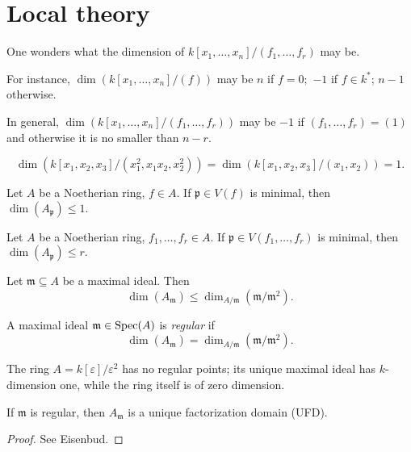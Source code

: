 \section{Local theory}
One wonders what the dimension of \(k[x_1, \dotsc, x_n] / {(f_1, \dotsc, f_r)}\) may be.

For instance, \(\dim(k[x_1, \dotsc, x_n]/{(f)})\) may be \(n\) if \(f=0;\) \(-1\) if \(f \in k^*\); \(n-1\) otherwise.

In general, \(\dim(k[x_1, \dotsc, x_n]/{(f_1, \dotsc, f_r)})\) may be \(-1\) if \((f_1, \dotsc, f_r) = (1)\) and otherwise it is no smaller than \(n - r.\)

\begin{example}
  \[\dim(k[x_1, x_2, x_3]/{(x_1^2, x_1 x_2, x_2^2)}) = \dim(k[x_1, x_2, x_3]/{(x_1, x_2)}) = 1.\]
\end{example}

\begin{theorem}
  Let \(A\) be a Noetherian ring, \(f \in A.\) If \(\mathfrak p \in V(f)\) is minimal, then
  \(\dim(A_{\mathfrak p}) \leq 1.\)
\end{theorem}

\begin{corollary}
  Let \(A\) be a Noetherian ring, \(f_1, \dotsc, f_r \in A.\) If \(\mathfrak p \in V(f_1, \dotsc, f_r)\) is minimal, then \(\dim(A_{\mathfrak p}) \leq r.\)
\end{corollary}

\begin{corollary}
  Let \(\mathfrak m \subseteq A\) be a  maximal ideal. Then
  \[\dim(A_{\mathfrak m}) \leq \dim_{A/{\mathfrak m}} (\mathfrak m /{\mathfrak m^2}).\] 
\end{corollary}

\begin{df}
  A maximal ideal \(\mathfrak m \in \text{Spec}(A)\) is \emph{regular} if
  \[\dim(A_{\mathfrak m}) = \dim_{A/{\mathfrak m}} (\mathfrak m /{\mathfrak m^2}).\]
\end{df}

\begin{example}
  The ring \(A = k[\varepsilon]/{\varepsilon^2}\) has no regular points; its unique maximal ideal has \(k\)-dimension one, while the ring itself is of zero dimension.
\end{example}

\begin{theorem}
  If \(\mathfrak m\) is regular, then \(A_{\mathfrak m}\) is a unique factorization domain (UFD).
\end{theorem}
\begin{proof}
  See Eisenbud.
\end{proof}

